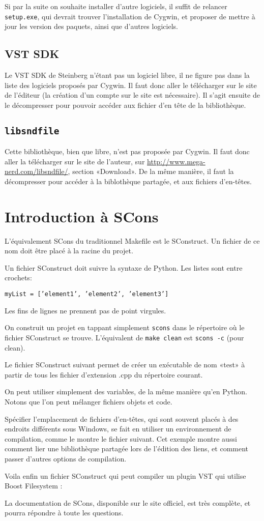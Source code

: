 Si par la suite on souhaite installer d'autre logiciels, il suffit de relancer {\tt setup.exe}, qui devrait trouver l'installation de Cygwin, et proposer de mettre à jour les version des paquets, ainsi que d'autres logiciels.
\subsection{VST SDK}
Le VST SDK de Steinberg n'étant pas un logiciel libre, il ne figure pas dans la liste des logiciels proposés par Cygwin. Il faut donc aller le télécharger sur le site de l'éditeur (la création d'un compte sur le site est nécessaire). Il s'agit ensuite de le décompresser pour pouvoir accéder aux fichier d'en tête de la bibliothèque.
\subsection{{\tt libsndfile}}
Cette bibliothèque, bien que libre, n'est pas proposée par Cygwin. Il faut donc aller la télécharger sur le site de l'auteur, sur \url{http://www.mega-nerd.com/libsndfile/}, section «Download». De la même manière, il faut la décompresser pour accéder à la biblothèque partagée, et aux fichiers d'en-têtes.
\section{Introduction à SCons}
L'équivalement SCons du traditionnel Makefile est le SConstruct. Un fichier de ce nom doit être placé à la racine du projet.

Un fichier SConstruct doit suivre la syntaxe de Python. Les listes sont entre crochets: 

{\tt myList = ['element1', 'element2', 'element3']}

Les fins de lignes ne prennent pas de point virgules.

On construit un projet en tappant simplement {\tt scons} dans le répertoire où le fichier SConstruct se trouve. L'équivalent de {\tt make clean} est {\tt scons -c} (pour clean).

Le fichier SConstruct suivant permet de créer un exécutable de nom «test» à partir de tous les fichier d'extension .cpp du répertoire courant.


On peut utiliser simplement des variables, de la même manière qu'en Python. Notons que l'on peut mélanger fichiers objets et code.

Spécifier l'emplacement de fichiers d'en-têtes, qui sont souvent placés à des endroits différents sous Windows, se fait en utiliser un environnement de compilation, comme le montre le fichier suivant. Cet exemple montre aussi comment lier une bibliothèque partagée lors de l'édition des liens, et comment passer d'autres options de compilation.
\newpage
{}

Voila enfin un fichier SConstruct qui peut compiler un plugin VST qui utilise Boost Filesystem :

La documentation de SCons, disponible sur le site officiel, est très complète, et pourra répondre à toute les questions.



